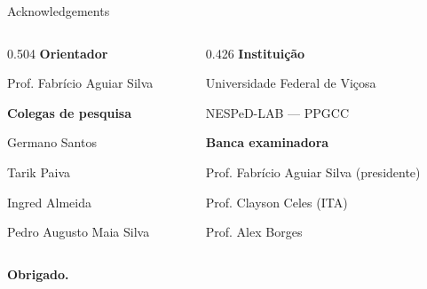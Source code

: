 \documentclass{beamer}
\begin{document}
{
\specialframe
\begin{frame}{Acknowledgements}
    \vfill
    \begin{columns}[T,onlytextwidth]
        \begin{column}{0.504\textwidth}
            {\large\textbf{Orientador}}\par\smallskip
            Prof. Fabrício Aguiar Silva

            \bigskip
            {\large\textbf{Colegas de pesquisa}}\par\smallskip
            Germano Santos\par
            Tarik Paiva\par
            Ingred Almeida\par
            Pedro Augusto Maia Silva
        \end{column}
        \hfill
        \begin{column}{0.426\textwidth}
            {\large\textbf{Instituição}}\par\smallskip
            Universidade Federal de Viçosa\par
            NESPeD-LAB --- PPGCC

            \bigskip
            {\large\textbf{Banca examinadora}}\par\smallskip
            Prof. Fabrício Aguiar Silva {\small(presidente)}\par
            Prof. Clayson Celes {\small(ITA)}\par
            Prof. Alex Borges
        \end{column}
    \end{columns}
    \vfill
    {\large\textbf{Obrigado.}}
    \vspace{2mm}
\end{frame}
}


\miniframesoff
\end{document}
